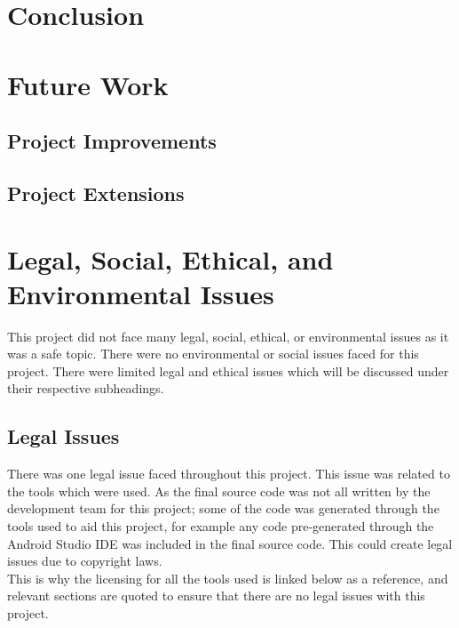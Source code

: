 \documentclass{article}
\begin{document}

\section{Conclusion}
\label{section:conclusion}

\section{Future Work}
\label{section:futureWork}

\subsection{Project Improvements}

\subsection{Project Extensions}

\section{Legal, Social, Ethical, and Environmental Issues}
\label{section:issues}

This project did not face many legal, social, ethical, or environmental issues as it was a safe topic. There were no environmental or social issues faced for this project. There were limited legal and ethical issues which will be discussed under their respective subheadings. 

\subsection{Legal Issues}

There was one legal issue faced throughout this project. This issue was related to the tools which were used. As the final source code was not all written by the development team for this project; some of the code was generated through the tools used to aid this project, for example any code pre-generated through the Android Studio IDE was included in the final source code. This could create legal issues due to copyright laws. \\

This is why the licensing for all the tools used is linked below as a reference, and relevant sections are quoted to ensure that there are no legal issues with this project. \\
\end{document}
